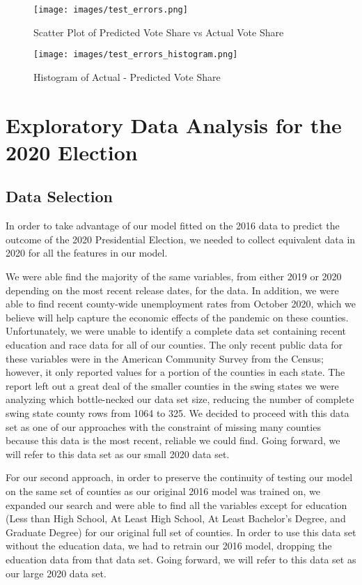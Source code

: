 \documentclass[letterpaper, twocolumn]{article}
\begin{document}
\begin{figure}[h]
    \centering
    \texttt{[image: images/test\_errors.png]}
    \caption{Scatter Plot of Predicted Vote Share vs Actual Vote Share}
    \label{fig:arstmade}
\end{figure}


\begin{figure}[h]
    \centering
    \texttt{[image: images/test\_errors\_histogram.png]}
    \caption{Histogram of Actual - Predicted Vote Share}
    \label{fig:arstmade}
\end{figure}


\section{Exploratory Data Analysis for the 2020 Election}
\subsection{Data Selection}

In order to take advantage of our model fitted on the 2016 data to predict the outcome of the 2020 Presidential Election, we needed to collect equivalent data in 2020 for all the features in our model.

We were able find the majority of the same variables, from either 2019 or 2020 depending on the most recent release dates, for the data. In addition, we were able to find recent county-wide unemployment rates from October 2020, which we believe will help capture the economic effects of the pandemic on these counties. Unfortunately, we were unable to identify a complete data set containing recent education and race data for all of our counties. The only recent public data for these variables were in the American Community Survey from the Census; however, it only reported values for a portion of the counties in each state. The report left out a great deal of the smaller counties in the swing states we were analyzing which bottle-necked our data set size, reducing the number of complete swing state county rows from 1064 to 325. We decided to proceed with this data set as one of our approaches with the constraint of missing many counties because this data is the most recent, reliable we could find. Going forward, we will refer to this data set as our small 2020 data set.


For our second approach, in order to preserve the continuity of testing our model on the same set of counties as our original 2016 model was trained on, we expanded our search and were able to find all the variables except for education (Less than High School, At Least High School, At Least Bachelor's Degree, and Graduate Degree) for our original full set of counties. In order to use this data set without the education data, we had to retrain our 2016 model, dropping the education data from that data set. Going forward, we will refer to this data set as our large 2020 data set.
\end{document}
